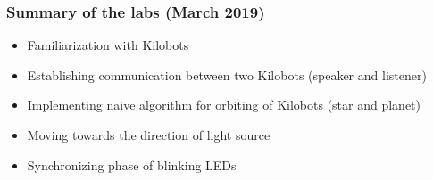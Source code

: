 \begin{frame}
    \frametitle{Summary of the labs (March 2019)}
    \begin{itemize}
        \item Familiarization with Kilobots
        \item Establishing communication between two Kilobots (speaker and listener)
        \item Implementing naive algorithm for orbiting of Kilobots (star and planet)
        \item Moving towards the direction of light source
        \item Synchronizing phase of blinking LEDs
    \end{itemize}
\end{frame}